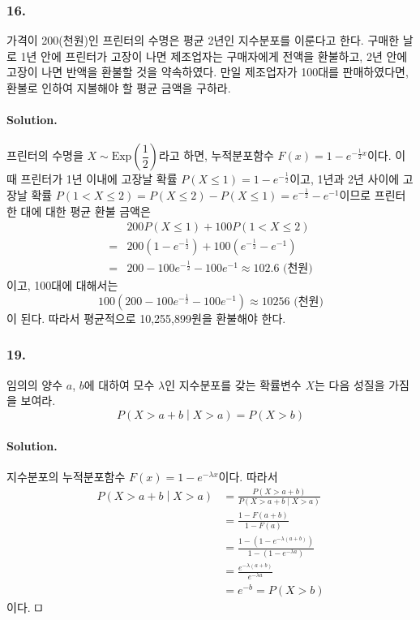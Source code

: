 \subsubsection{16.} 가격이 200(천원)인 프린터의 수명은 평균 2년인 지수분포를 이룬다고 한다. 구매한 날로 1년 안에 프린터가 고장이 나면
제조업자는 구매자에게 전액을 환불하고, 2년 안에 고장이 나면 반액을 환불할 것을 약속하였다. 만일 제조업자가 100대를 판매하였다면, 환불로 인하여 지불해야 할 평균 금액을 구하라.

\paragraph{Solution.} 프린터의 수명을 $X \sim \mathrm{Exp}\left(\dfrac{1}{2}\right)$라고 하면, 누적분포함수 $F\left(x\right) = 1-e^{-\frac{1}{2}x}$이다.
이 때 프린터가 1년 이내에 고장날 확률 $P\left(X\leq1\right) = 1-e^{-\frac{1}{2}}$이고,
1년과 2년 사이에 고장날 확률 $P\left(1<X\leq2\right) = P\left(X\leq2\right) - P\left(X\leq1\right) = e^{-\frac{1}{2}} - e^{-1}$이므로
프린터 한 대에 대한 평균 환불 금액은
\begin{align*}
	& 200 P\left(X\leq1\right) + 100 P\left(1<X\leq2\right) \\
	=& 200 \left(1-e^{-\frac{1}{2}}\right) + 100 \left(e^{-\frac{1}{2}} - e^{-1}\right) \\
	=& 200 - 100 e^{-\frac{1}{2}} - 100 e^{-1} \approx 102.6 \mbox{ (천원)}
\end{align*}
이고, 100대에 대해서는
\[100\left(200 - 100 e^{-\frac{1}{2}} - 100 e^{-1}\right) \approx 10256 \mbox{ (천원)} \]
이 된다. 따라서 평균적으로 10,255,899원을 환불해야 한다.

\subsubsection{19.} 임의의 양수 $a$, $b$에 대하여 모수 $\lambda$인 지수분포를 갖는 확률변수 $X$는 다음 성질을 가짐을 보여라.
\[P\left(X>a+b\middle|X>a\right) = P\left(X>b\right)\]

\paragraph{Solution.} 지수분포의 누적분포함수 $F\left(x\right) = 1-e^{-\lambda x}$이다. 따라서
\begin{align*}
	P\left(X>a+b\middle|X>a\right) &= \frac{P\left(X>a+b\right)}{P\left(X>a+b\middle|X>a\right)} \\
	&= \frac{1-F\left(a+b\right)}{1-F\left(a\right)} \\
	&= \frac{1-\left(1-e^{-\lambda \left(a+b\right)}\right)}{1-\left(1-e^{-\lambda a}\right)} \\
	&= \frac{e^{-\lambda \left(a+b\right)}}{e^{-\lambda a}} \\
	&= e^{-b} = P\left(X>b\right)
\end{align*}
이다. $\qed$

